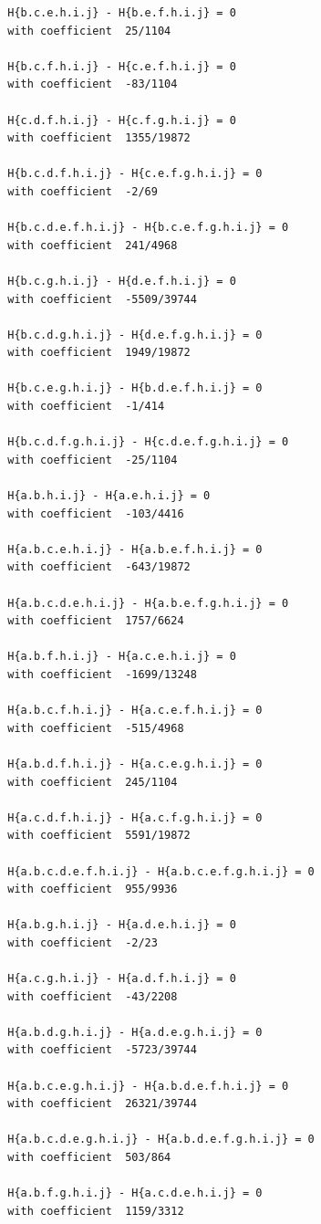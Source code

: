 \documentclass[11pt, a4paper]{kybernetika}
\begin{document}
\begin{verbatim}
		H{b.c.e.h.i.j} - H{b.e.f.h.i.j} = 0
		with coefficient  25/1104
		
		H{b.c.f.h.i.j} - H{c.e.f.h.i.j} = 0
		with coefficient  -83/1104
		
		H{c.d.f.h.i.j} - H{c.f.g.h.i.j} = 0
		with coefficient  1355/19872
		
		H{b.c.d.f.h.i.j} - H{c.e.f.g.h.i.j} = 0
		with coefficient  -2/69
		
		H{b.c.d.e.f.h.i.j} - H{b.c.e.f.g.h.i.j} = 0
		with coefficient  241/4968
		
		H{b.c.g.h.i.j} - H{d.e.f.h.i.j} = 0
		with coefficient  -5509/39744
		
		H{b.c.d.g.h.i.j} - H{d.e.f.g.h.i.j} = 0
		with coefficient  1949/19872
		
		H{b.c.e.g.h.i.j} - H{b.d.e.f.h.i.j} = 0
		with coefficient  -1/414
		
		H{b.c.d.f.g.h.i.j} - H{c.d.e.f.g.h.i.j} = 0
		with coefficient  -25/1104
		
		H{a.b.h.i.j} - H{a.e.h.i.j} = 0
		with coefficient  -103/4416
		
		H{a.b.c.e.h.i.j} - H{a.b.e.f.h.i.j} = 0
		with coefficient  -643/19872
		
		H{a.b.c.d.e.h.i.j} - H{a.b.e.f.g.h.i.j} = 0
		with coefficient  1757/6624
		
		H{a.b.f.h.i.j} - H{a.c.e.h.i.j} = 0
		with coefficient  -1699/13248
		
		H{a.b.c.f.h.i.j} - H{a.c.e.f.h.i.j} = 0
		with coefficient  -515/4968
		
		H{a.b.d.f.h.i.j} - H{a.c.e.g.h.i.j} = 0
		with coefficient  245/1104
		
		H{a.c.d.f.h.i.j} - H{a.c.f.g.h.i.j} = 0
		with coefficient  5591/19872
		
		H{a.b.c.d.e.f.h.i.j} - H{a.b.c.e.f.g.h.i.j} = 0
		with coefficient  955/9936
		
		H{a.b.g.h.i.j} - H{a.d.e.h.i.j} = 0
		with coefficient  -2/23
		
		H{a.c.g.h.i.j} - H{a.d.f.h.i.j} = 0
		with coefficient  -43/2208
		
		H{a.b.d.g.h.i.j} - H{a.d.e.g.h.i.j} = 0
		with coefficient  -5723/39744
		
		H{a.b.c.e.g.h.i.j} - H{a.b.d.e.f.h.i.j} = 0
		with coefficient  26321/39744
		
		H{a.b.c.d.e.g.h.i.j} - H{a.b.d.e.f.g.h.i.j} = 0
		with coefficient  503/864
		
		H{a.b.f.g.h.i.j} - H{a.c.d.e.h.i.j} = 0
		with coefficient  1159/3312
		

\end{verbatim}
\end{document}
